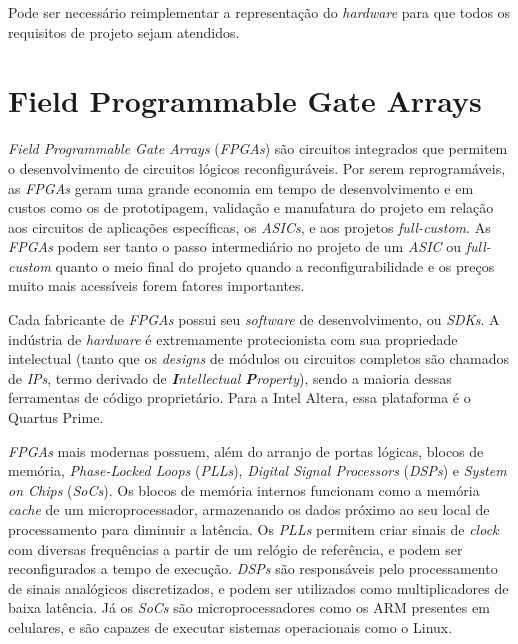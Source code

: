     { Pode ser necessário reimplementar a
        representação do \textit{hardware} para que todos os requisitos de projeto
        sejam atendidos.
    }


\section{Field Programmable Gate Arrays}
{ \textit{Field Programmable Gate Arrays} (\textit{FPGAs}) são circuitos
    integrados que permitem o desenvolvimento de circuitos lógicos
    reconfiguráveis. Por serem reprogramáveis, as \textit{FPGAs} geram uma
    grande economia em tempo de desenvolvimento e em custos como os de
    prototipagem, validação e manufatura do projeto em relação aos circuitos de
    aplicações específicas, os \textit{ASICs}, e aos projetos
    \textit{full-custom}. As \textit{FPGAs} podem ser tanto o passo
    intermediário no projeto de um \textit{ASIC} ou \textit{full-custom} quanto
    o meio final do projeto quando a reconfigurabilidade e os preços muito mais
    acessíveis forem fatores importantes.
}

{ Cada fabricante de \textit{FPGAs} possui seu \textit{software} de
    desenvolvimento, ou \textit{SDKs}. A indústria de \textit{hardware} é
    extremamente protecionista com sua propriedade intelectual (tanto que os
    \textit{designs} de módulos ou circuitos completos são chamados de \textit{IPs},
    termo derivado de \textit{\textbf{I}ntellectual \textbf{P}roperty}), sendo
    a maioria dessas ferramentas de código proprietário. Para a Intel Altera,
    essa plataforma é o Quartus Prime.
}

{ \textit{FPGAs} mais modernas possuem, além do arranjo de portas lógicas,
    blocos de memória, \textit{Phase-Locked Loops} (\textit{PLLs}),
    \textit{Digital Signal Processors} (\textit{DSPs}) e \textit{System on
    Chips} (\textit{SoCs}). Os blocos de memória internos funcionam como a memória
    \textit{cache} de um microprocessador, armazenando os dados próximo ao seu
    local de processamento para diminuir a latência. Os \textit{PLLs} permitem criar
    sinais de \textit{clock} com diversas frequências a partir de um relógio de
    referência, e podem ser reconfigurados a tempo de execução. \textit{DSPs}
    são responsáveis pelo processamento de sinais analógicos discretizados, e
    podem ser utilizados como multiplicadores de baixa latência. Já os
    \textit{SoCs} são microprocessadores como os ARM presentes em celulares,
    e são capazes de executar sistemas operacionais como o Linux.
}

